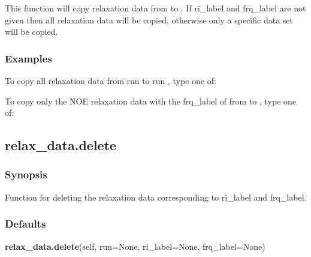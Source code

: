  This function will copy relaxation data from  to .  If ri\_label and frq\_label are not given then all relaxation data will be copied, otherwise only a specific data set will be copied. 
  

  
 \subsubsection{Examples} 

 To copy all relaxation data from run  to run , type one of: 
  





 To copy only the NOE relaxation data with the frq\_label of  from  to , type one of: 
  



  

 \newpage 

 \subsection{relax\_data.delete} 

  
 \subsubsection{Synopsis} 

 Function for deleting the relaxation data corresponding to ri\_label and frq\_label. 
  

  
 \subsubsection{Defaults} 

 \textsf{\textbf{relax\_data.delete}(self, run=None, ri\_label=None, frq\_label=None)} 

